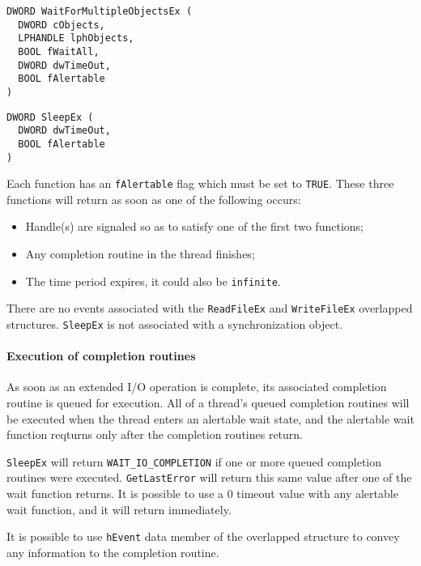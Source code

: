 \begin{verbatim}
DWORD WaitForMultipleObjectsEx (
  DWORD cObjects,
  LPHANDLE lphObjects,
  BOOL fWaitAll,
  DWORD dwTimeOut,
  BOOL fAlertable
)
\end{verbatim}

\begin{verbatim}
DWORD SleepEx (
  DWORD dwTimeOut,
  BOOL fAlertable
)
\end{verbatim}

Each function has an \texttt{fAlertable} flag which must be set to \texttt{TRUE}. These three functions will return as soon as one of the following occurs:
\begin{itemize}
\item Handle(s) are signaled so as to satisfy one of the first two functions;
\item Any completion routine in the thread finishes;
\item The time period expires, it could also be \texttt{infinite}.
\end{itemize}
There are no events associated with the \texttt{ReadFileEx} and \texttt{WriteFileEx} overlapped structures. \texttt{SleepEx} is not associated with a synchronization object.

\paragraph{Execution of completion routines}
As soon as an extended I/O operation is complete, its associated completion routine is queued for execution. All of a thread's queued completion routines will be executed when the thread enters an alertable wait state, and the alertable wait function reqturns only after the completion routines return.

\texttt{SleepEx} will return \texttt{WAIT\_IO\_COMPLETION} if one or more queued completion routines were executed. \texttt{GetLastError} will return this same value after one of the wait function returns. It is possible to use a 0 timeout value with any alertable wait function, and it will return immediately.

It is possible to use \texttt{hEvent} data member of the overlapped structure to convey any information to the completion routine.